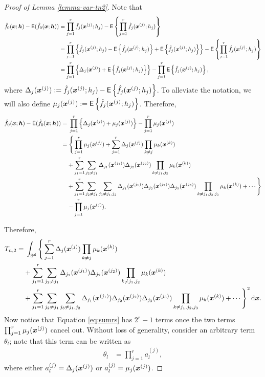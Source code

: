\documentclass[oneside,11pt]{article}
\begin{document}
\begin{proof}[Proof of Lemma \ref{lemma-var-tn2}]
Note that
\begin{align*}
    \hat{f}_{0}(\boldsymbol{x};{\boldsymbol{h}}) - \mathsf{E} (\hat{f}_{0}(\boldsymbol{x};{\boldsymbol{h}})) &= \prod_{j=1}^{r} \hat{f}_{j}(\boldsymbol{x}^{(j)};h_j) - \mathsf{E} \left\{\prod_{j=1}^{r} \hat{f}_{j}(\boldsymbol{x}^{(j)};h_j)\right\} \\
    &= \prod_{j=1}^{r} \left\{ \hat{f}_{j}(\boldsymbol{x}^{(j)};h_j) - \mathsf{E} \left\{ \hat{f}_{j}(\boldsymbol{x}^{(j)};h_j)\right\} + \mathsf{E} \left\{ \hat{f}_{j}(\boldsymbol{x}^{(j)};h_j)\right\}\right\} - \mathsf{E} \left\{\prod_{j=1}^{r} \hat{f}_{j}(\boldsymbol{x}^{(j)};h_j)\right\} \\
    &= \prod_{j=1}^{r} \left\{ \Delta_j(\boldsymbol{x}^{(j)}) + \mathsf{E} \left\{ \hat{f}_{j}(\boldsymbol{x}^{(j)};h_j)\right\}\right\} - \prod_{j=1}^{r} \mathsf{E} \left\{\hat{f}_{j}(\boldsymbol{x}^{(j)};h_j)\right\},
\end{align*}
where $\Delta_j(\boldsymbol{x}^{(j)}) :=  \hat{f}_{j}(\boldsymbol{x}^{(j)};h_j) - \mathsf{E} \left\{ \hat{f}_{j}(\boldsymbol{x}^{(j)};h_j)\right\}$. To alleviate the notation, we will also define $\mu_j(\boldsymbol{x}^{(j)}) := \mathsf{E} \left\{\hat{f}_{j}(\boldsymbol{x}^{(j)};h_j)\right\}$. Therefore,
\begin{align}
    \hat{f}_{0}(\boldsymbol{x};{\boldsymbol{h}}) - \mathsf{E} (\hat{f}_{0}(\boldsymbol{x};{\boldsymbol{h}})) =&\; \prod_{j=1}^{r} \left\{ \Delta_j(\boldsymbol{x}^{(j)}) + \mu_j(\boldsymbol{x}^{(j)})\right\} - \prod_{j=1}^{r} \mu_j(\boldsymbol{x}^{(j)}) \nonumber\\
    =&\; \Bigg\{ \prod_{j=1}^{r} \mu_j(\boldsymbol{x}^{(j)}) + \sum_{j=1}^{r}  \Delta_j(\boldsymbol{x}^{(j)}) \prod_{k \ne j}  \mu_k(\boldsymbol{x}^{(k)}) \nonumber\\
    &+ \sum_{j_1=1}^{r} \sum_{j_2 \ne j_1}  \Delta_{j_1}(\boldsymbol{x}^{(j_1)}) \Delta_{j_2}(\boldsymbol{x}^{(j_2)}) \prod_{k \ne j_1,j_2}  \mu_k(\boldsymbol{x}^{(k)}) \nonumber\\
    &+ \sum_{j_1=1}^{r} \sum_{j_2 \ne j_1} \sum_{j_3 \ne j_1,j_2}  \Delta_{j_1}(\boldsymbol{x}^{(j_1)}) \Delta_{j_2}(\boldsymbol{x}^{(j_2)}) \Delta_{j_3}(\boldsymbol{x}^{(j_3)}) \prod_{k \ne j_1,j_2,j_3} \mu_k(\boldsymbol{x}^{(k)}) + \cdots \Bigg\} \nonumber\\
    &- \prod_{j=1}^{r} \mu_j(\boldsymbol{x}^{(j)}).\label{eq:sumrs}
\end{align}

Therefore,
\begin{align*}
    T_{n,2} =&\; \int_{\mathbb{S}^{\boldsymbol{d}}} \Bigg\{ \sum_{j=1}^{r}  \Delta_j(\boldsymbol{x}^{(j)}) \prod_{k \ne j}  \mu_k(\boldsymbol{x}^{(k)}) \\
     &+ \sum_{j_1=1}^{r} \sum_{j_2 \ne j_1}  \Delta_{j_1}(\boldsymbol{x}^{(j_1)}) \Delta_{j_2}(\boldsymbol{x}^{(j_2)}) \prod_{k \ne j_1,j_2}  \mu_k(\boldsymbol{x}^{(k)}) \\
    &+ \sum_{j_1=1}^{r} \sum_{j_2 \ne j_1} \sum_{j_3 \ne j_1,j_2}  \Delta_{j_1}(\boldsymbol{x}^{(j_1)}) \Delta_{j_2}(\boldsymbol{x}^{(j_2)}) \Delta_{j_3}(\boldsymbol{x}^{(j_3)}) \prod_{k \ne j_1,j_2,j_3} \mu_k(\boldsymbol{x}^{(k)}) + \cdots \Bigg\}^2 \,\mathrm{d} \boldsymbol{x}.
\end{align*}
Now notice that Equation \eqref{eq:sumrs} has $2^r -1$ terms once the two terms $\prod_{j=1}^{r} \mu_j(\boldsymbol{x}^{(j)})$ cancel out. Without loss of generality, consider an arbitrary term $\theta_l$; note that this term can be written as
\begin{align*}
    \theta_l &= \prod_{j=1}^{r} a_l^{(j)},
\end{align*}
where either $a_l^{(j)} = \Delta_j(\boldsymbol{x}^{(j)})$ or $a_l^{(j)} = \mu_j(\boldsymbol{x}^{(j)})$.


\end{proof}
\end{document}
